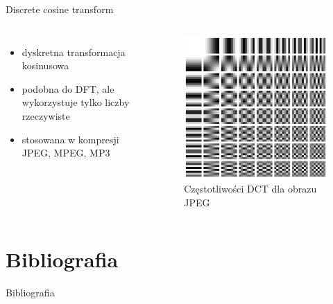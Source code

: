 \documentclass[polish, 12pt, aspectratio=169]{beamer}
\begin{document}
\begin{frame}{Discrete cosine transform}
    \begin{columns}
        \begin{itemize}[<+->]
            \setlength\itemsep{1em}
            \item dyskretna transformacja kosinusowa
            \item podobna do DFT, ale wykorzystuje tylko liczby rzeczywiste
            \item stosowana w kompresji JPEG, MPEG, MP3
        \end{itemize}
    \pause{}
        \vspace{1em}
        \begin{figure}
            \includegraphics[width=\linewidth]{img/dct-jpeg.png}
            \caption*{Częstotliwości DCT dla obrazu JPEG}
        \end{figure}
    \end{columns}
\end{frame}

\section*{Bibliografia}

\begin{frame}[allowframebreaks]{Bibliografia}
    \nocite{*}
    \printbibliography[heading=none]
\end{frame}
\end{document}
